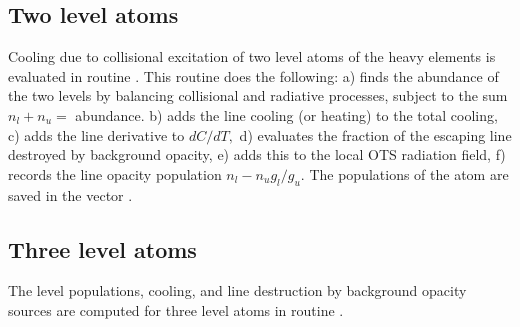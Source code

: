 \subsection{Two level atoms}

Cooling due to collisional excitation of two level atoms of the heavy
elements is evaluated in routine .  This routine does the following:
a) finds the abundance of the two levels by balancing collisional and
radiative processes, subject to the sum $n_l +n_u =$ abundance.  b) adds the
line cooling (or heating) to the total cooling, c) adds the line derivative
to $dC/dT,$ d) evaluates the fraction of the escaping line destroyed by
background opacity, e) adds this to the local OTS radiation field, f) records
the line opacity population $n_l-n_u g_l/g_u$.  The populations of the atom are
saved in the vector .

\subsection{Three level atoms}

The level populations, cooling, and line destruction by background opacity
sources are computed for three level atoms in routine .

